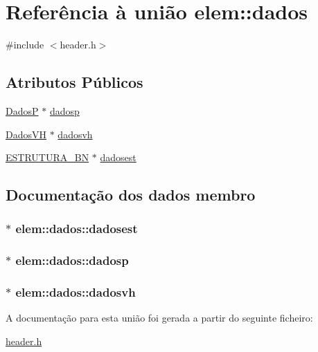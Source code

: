 \hypertarget{unionelem_1_1dados}{\section{Referência à união elem\-:\-:dados}
\label{unionelem_1_1dados}
}


{\ttfamily \#include $<$header.\-h$>$}

\subsection*{Atributos Públicos}
\begin{DoxyCompactItemize}
\item 
\hyperlink{header_8h_a469ff72408bc348b417cc0ee2cf860b0}{Dados\-P} $\ast$ \hyperlink{unionelem_1_1dados_aa60f6caec23042f133214228d9d48782}{dadosp}
\item 
\hyperlink{header_8h_ac31cca6d54fd1fce82eca72192564cd4}{Dados\-V\-H} $\ast$ \hyperlink{unionelem_1_1dados_aebdf1ceb7240100ec0890b018d503bd5}{dadosvh}
\item 
\hyperlink{header_8h_a341ac1667f3dc23635b071398592e724}{E\-S\-T\-R\-U\-T\-U\-R\-A\-\_\-\-B\-N} $\ast$ \hyperlink{unionelem_1_1dados_a61537c231156cd0e3cc59aa2b4875df8}{dadosest}
\end{DoxyCompactItemize}


\subsection{Documentação dos dados membro}
\hypertarget{unionelem_1_1dados_a61537c231156cd0e3cc59aa2b4875df8}{
\subsubsection[{dadosest}]{$\ast$ elem\-::dados\-::dadosest}}\label{unionelem_1_1dados_a61537c231156cd0e3cc59aa2b4875df8}
\hypertarget{unionelem_1_1dados_aa60f6caec23042f133214228d9d48782}{
\subsubsection[{dadosp}]{$\ast$ elem\-::dados\-::dadosp}}\label{unionelem_1_1dados_aa60f6caec23042f133214228d9d48782}
\hypertarget{unionelem_1_1dados_aebdf1ceb7240100ec0890b018d503bd5}{
\subsubsection[{dadosvh}]{$\ast$ elem\-::dados\-::dadosvh}}\label{unionelem_1_1dados_aebdf1ceb7240100ec0890b018d503bd5}


A documentação para esta união foi gerada a partir do seguinte ficheiro\-:\begin{DoxyCompactItemize}
\item 
\hyperlink{header_8h}{header.\-h}\end{DoxyCompactItemize}
